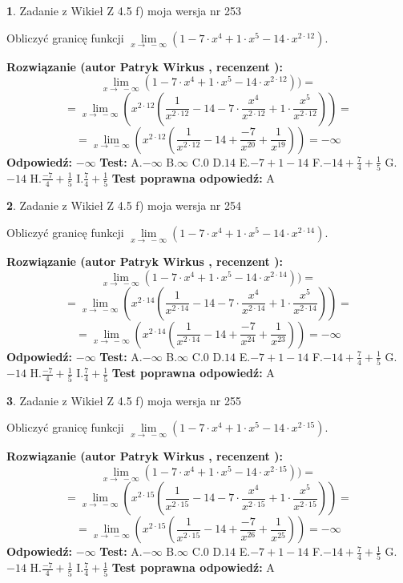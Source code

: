 \documentclass[12pt, a4paper]{article}
\theoremstyle{definition} %
\newtheorem{zad}{}
\newcommand{\zadStart}[1]{\begin{zad}#1\newline}
\newcommand{\zadStop}{\end{zad}}
\newcommand{\rozwStart}[2]{\noindent \textbf{Rozwiązanie (autor #1 , recenzent #2): }\newline}
\newcommand{\rozwStop}{\newline}
\newcommand{\odpStart}{\noindent \textbf{Odpowiedź:}\newline}
\newcommand{\odpStop}{\newline}
\newcommand{\testStart}{\noindent \textbf{Test:}\newline}
\newcommand{\testStop}{\newline}
\newcommand{\kluczStart}{\noindent \textbf{Test poprawna odpowiedź:}\newline}
\newcommand{\kluczStop}{\newline}
\begin{document}
\zadStart{Zadanie z Wikieł Z 4.5 f) moja wersja nr 253}



Obliczyć granicę funkcji  $\lim\limits_{x\to\ -\infty}(1 - 7 \cdot x^{4}+1 \cdot x^{5}- 14 \cdot x^{2\cdot12})$.
\zadStop
\rozwStart{Patryk Wirkus}{}
$$\lim\limits_{x\to\ -\infty}(1 - 7 \cdot x^{4}+1 \cdot x^{5}- 14 \cdot x^{2\cdot12}))=$$
$$=\lim\limits_{x\to\ -\infty}(x^{2\cdot12}(\frac{1}{x^{2\cdot12}}-14 -7 \cdot \frac{x^{4}}{x^{2\cdot12}}+1 \cdot \frac{x^{5}}{x^{2\cdot12}}))=$$
$$=\lim\limits_{x\to\ -\infty}(x^{2\cdot12}(\frac{1}{x^{2\cdot12}}-14 + \frac{-7}{x^{20}}+ \frac{1}{x^{19}}))=-\infty$$
\rozwStop
\odpStart
$-\infty$
\odpStop
\testStart
A.$-\infty$ B.$\infty$ C.$0$ D.$14$ E.$-7 + 1 - 14$
F.$-14+\frac{7}{4}+\frac{1}{5}$ G.$-14$
H.$\frac{-7}{4}+\frac{1}{5}$
I.$\frac{7}{4}+\frac{1}{5}$
\testStop
\kluczStart
A
\kluczStop



\zadStart{Zadanie z Wikieł Z 4.5 f) moja wersja nr 254}



Obliczyć granicę funkcji  $\lim\limits_{x\to\ -\infty}(1 - 7 \cdot x^{4}+1 \cdot x^{5}- 14 \cdot x^{2\cdot14})$.
\zadStop
\rozwStart{Patryk Wirkus}{}
$$\lim\limits_{x\to\ -\infty}(1 - 7 \cdot x^{4}+1 \cdot x^{5}- 14 \cdot x^{2\cdot14}))=$$
$$=\lim\limits_{x\to\ -\infty}(x^{2\cdot14}(\frac{1}{x^{2\cdot14}}-14 -7 \cdot \frac{x^{4}}{x^{2\cdot14}}+1 \cdot \frac{x^{5}}{x^{2\cdot14}}))=$$
$$=\lim\limits_{x\to\ -\infty}(x^{2\cdot14}(\frac{1}{x^{2\cdot14}}-14 + \frac{-7}{x^{24}}+ \frac{1}{x^{23}}))=-\infty$$
\rozwStop
\odpStart
$-\infty$
\odpStop
\testStart
A.$-\infty$ B.$\infty$ C.$0$ D.$14$ E.$-7 + 1 - 14$
F.$-14+\frac{7}{4}+\frac{1}{5}$ G.$-14$
H.$\frac{-7}{4}+\frac{1}{5}$
I.$\frac{7}{4}+\frac{1}{5}$
\testStop
\kluczStart
A
\kluczStop



\zadStart{Zadanie z Wikieł Z 4.5 f) moja wersja nr 255}



Obliczyć granicę funkcji  $\lim\limits_{x\to\ -\infty}(1 - 7 \cdot x^{4}+1 \cdot x^{5}- 14 \cdot x^{2\cdot15})$.
\zadStop
\rozwStart{Patryk Wirkus}{}
$$\lim\limits_{x\to\ -\infty}(1 - 7 \cdot x^{4}+1 \cdot x^{5}- 14 \cdot x^{2\cdot15}))=$$
$$=\lim\limits_{x\to\ -\infty}(x^{2\cdot15}(\frac{1}{x^{2\cdot15}}-14 -7 \cdot \frac{x^{4}}{x^{2\cdot15}}+1 \cdot \frac{x^{5}}{x^{2\cdot15}}))=$$
$$=\lim\limits_{x\to\ -\infty}(x^{2\cdot15}(\frac{1}{x^{2\cdot15}}-14 + \frac{-7}{x^{26}}+ \frac{1}{x^{25}}))=-\infty$$
\rozwStop
\odpStart
$-\infty$
\odpStop
\testStart
A.$-\infty$ B.$\infty$ C.$0$ D.$14$ E.$-7 + 1 - 14$
F.$-14+\frac{7}{4}+\frac{1}{5}$ G.$-14$
H.$\frac{-7}{4}+\frac{1}{5}$
I.$\frac{7}{4}+\frac{1}{5}$
\testStop
\kluczStart
A
\kluczStop
\end{document}
